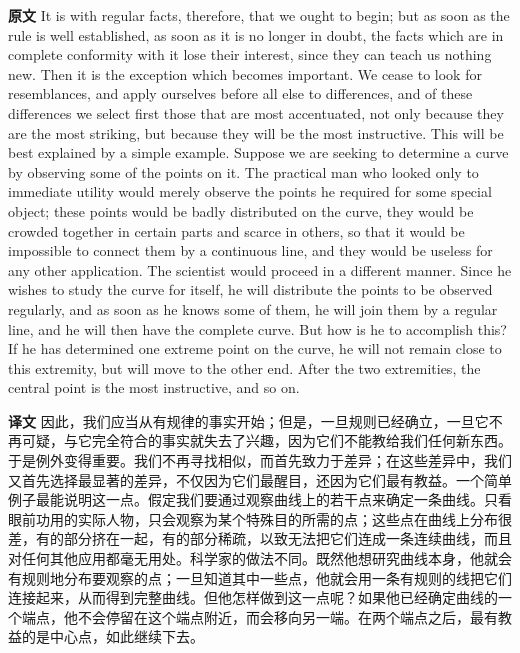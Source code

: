 \documentclass[UTF8,zihao=-4]{ctexart}
\newcommand{\BodyFont}{\fontsize{10.5pt}{15.5pt}\selectfont}
\newcommand{\origlabel}{\textbf{原文}\quad}
\newcommand{\translabel}{\textbf{译文}\quad}
\newenvironment{enblock}{\par\noindent\begingroup\BodyFont\origlabel}{\par\endgroup}
\newenvironment{zhblock}{\par\noindent\begingroup\BodyFont\translabel}{\par\endgroup\vspace{0.35em}}
\begin{document}
\begin{enblock}
It is with regular facts, therefore, that we ought to begin; but as soon as the rule is well established, as soon as it is no longer in doubt, the facts which are in complete conformity with it lose their interest, since they can teach us nothing new. Then it is the exception which becomes important. We cease to look for resemblances, and apply ourselves before all else to differences, and of these differences we select first those that are most accentuated, not only because they are the most striking, but because they will be the most instructive. This will be best explained by a simple example. Suppose we are seeking to determine a curve by observing some of the points on it. The practical man who looked only to immediate utility would merely observe the points he required for some special object; these points would be badly distributed on the curve, they would be crowded together in certain parts and scarce in others, so that it would be impossible to connect them by a continuous line, and they would be useless for any other application. The scientist would proceed in a different manner. Since he wishes to study the curve for itself, he will distribute the points to be observed regularly, and as soon as he knows some of them, he will join them by a regular line, and he will then have the complete curve. But how is he to accomplish this? If he has determined one extreme point on the curve, he will not remain close to this extremity, but will move to the other end. After the two extremities, the central point is the most instructive, and so on.
\end{enblock}
\begin{zhblock}
因此，我们应当从有规律的事实开始；但是，一旦规则已经确立，一旦它不再可疑，与它完全符合的事实就失去了兴趣，因为它们不能教给我们任何新东西。于是例外变得重要。我们不再寻找相似，而首先致力于差异；在这些差异中，我们又首先选择最显著的差异，不仅因为它们最醒目，还因为它们最有教益。一个简单例子最能说明这一点。假定我们要通过观察曲线上的若干点来确定一条曲线。只看眼前功用的实际人物，只会观察为某个特殊目的所需的点；这些点在曲线上分布很差，有的部分挤在一起，有的部分稀疏，以致无法把它们连成一条连续曲线，而且对任何其他应用都毫无用处。科学家的做法不同。既然他想研究曲线本身，他就会有规则地分布要观察的点；一旦知道其中一些点，他就会用一条有规则的线把它们连接起来，从而得到完整曲线。但他怎样做到这一点呢？如果他已经确定曲线的一个端点，他不会停留在这个端点附近，而会移向另一端。在两个端点之后，最有教益的是中心点，如此继续下去。\end{zhblock}
\end{document}

